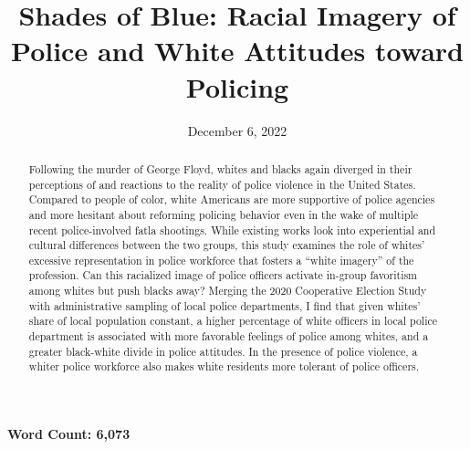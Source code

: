 \documentclass[
  12pt,
]{article}
\title{\textbf{Shades of Blue: Racial Imagery of Police and 
White Attitudes toward Policing}}
\date{December 6, 2022}
\begin{document}

\maketitle


\thispagestyle{empty}

\begin{abstract} 
\noindent %
Following the murder of George Floyd, whites and blacks again diverged
in their perceptions of and reactions to the reality of police violence
in the United States. Compared to people of color, white Americans are
more supportive of police agencies and more hesitant about reforming
policing behavior even in the wake of multiple recent police-involved
fatla shootings. While existing works look into experiential and
cultural differences between the two groups, this study examines the
role of whites' excessive representation in police workforce that
fosters a ``white imagery'' of the profession. Can this racialized image
of police officers activate in-group favoritism among whites but push
blacks away? Merging the 2020 Cooperative Election Study with
administrative sampling of local police departments, I find that given
whites' share of local population constant, a higher percentage of white
officers in local police department is associated with more favorable
feelings of police among whites, and a greater black-white divide in
police attitudes. In the presence of police violence, a whiter police
workforce also makes white residents more tolerant of police officers.
\end{abstract}

\begin{center}
	\textbf{Word Count: 6,073}
\end{center} 

\begin{quote}
\end{quote}

\newpage \clearpage {}\captionsetup{labelfont = bf, font = small}


\end{document}
